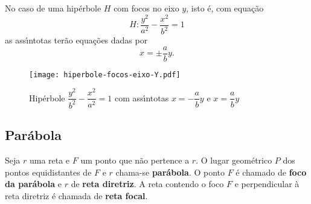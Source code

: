 \begin{observacao}
  No caso de uma hip\'erbole $H$ com focos no eixo $y$, isto \'e, com equa\c{c}\~ao
  \[
    H: \dfrac{y^2}{a^2} - \dfrac{x^2}{b^2} = 1
  \]
  as ass{\'\i}ntotas ter\~ao equa\c{c}\~oes dadas por
  \[
    x = \pm \dfrac{a}{b}y.
  \]
\end{observacao}

\begin{figure}[h]
  \centering
  \caption{Hip\'erbole $\dfrac{y^2}{b^2} - \dfrac{x^2}{a^2} = 1$ com ass{\'\i}ntotas $x = -\dfrac{a}{b}y$ e $x = \dfrac{a}{b}y$}
  \texttt{[image: hiperbole-focos-eixo-Y.pdf]}
\end{figure}




\subsection{Par\'abola} %
\label{sub:parabolas}

\begin{definicao}
  Seja $r$ uma reta e $F$ um ponto que n\~ao pertence a $r$. O lugar geom\'etrico $P$ dos pontos equidistantes de $F$ e $r$ chama-se \textbf{par\'abola}. O ponto $F$ \'e chamado de \textbf{foco da par\'abola} e $r$ de \textbf{reta diretriz}.  A reta contendo o foco $F$ e perpendicular \`a reta diretriz \'e chamada de \textbf{reta focal}.
\end{definicao}


